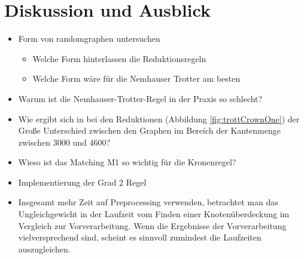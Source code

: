 
\chapter{Diskussion und Ausblick}
\label{ch:fazit}

\begin{itemize}
\item Form von randomgraphen untersuchen
	\begin{itemize}
	\item Welche Form hinterlassen die Reduktionsregeln
	\item Welche Form wäre für die Nemhauser Trotter am besten
	\end{itemize}
\item Warum ist die Nemhauser-Trotter-Regel in der Praxis so schlecht?
\item Wie ergibt sich in bei den Reduktionen (Abbildung \ref{fig:trottCrownOne}) der Große Unterschied zwischen den Graphen im Bereich der Kantenmenge zwischen 3000 und 4600?
\item Wieso ist das Matching M1 so wichtig für die Kronenregel?
\item Implementierung der Grad 2 Regel
\item Insgesamt mehr Zeit auf Preprocessing verwenden, betrachtet man das Ungleichgewicht in der Laufzeit vom Finden einer Knotenüberdeckung im Vergleich zur Vorverarbeitung. Wenn die Ergebnisse der Vorverarbeitung vielversprechend sind, scheint es sinnvoll zumindest die Laufzeiten auszugleichen.
\end{itemize}

